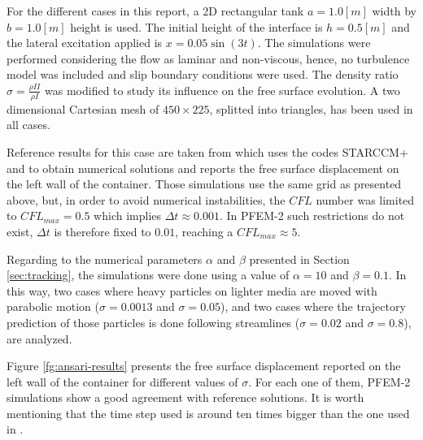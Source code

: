 For the different cases in this report, a 2D rectangular tank $a=1.0[m]$ width by $b=1.0[m]$ height is used. The initial height of the interface is $h=0.5[m]$ and the lateral excitation applied is $x=0.05\sin(3t)$. The simulations were performed considering the flow as laminar and non-viscous, hence, no turbulence model was included and slip boundary conditions were used. The density ratio $\sigma=\frac{\rho{II}}{\rho{I}}$ was modified to study its influence on the free surface evolution. A two dimensional Cartesian mesh of $450\times225$, splitted into triangles, has been used in all cases.

Reference results for this case are taken from \cite{Goni13} which uses the codes STARCCM+ and \OF to obtain numerical solutions and reports the free surface displacement on the left wall of the container. Those simulations use the same grid as presented above, but, in order to avoid numerical instabilities, the $CFL$ number was limited to $CFL_{max}=0.5$ which implies $\Delta t \approx 0.001$. In PFEM-2 such restrictions do not exist, $\Delta t$ is therefore fixed to $0.01$, reaching a $CFL_{max}\approx5$.

Regarding to the numerical parameters $\alpha$ and $\beta$ presented in Section \ref{sec:tracking}, the simulations were done using a value of $\alpha=10$ and $\beta=0.1$. In this way, two cases where heavy particles on lighter media are moved with parabolic motion ($\sigma=0.0013$ and $\sigma=0.05$), and two cases where the trajectory prediction of those particles is done following streamlines ($\sigma=0.02$ and $\sigma=0.8$), are analyzed.

Figure \ref{fg:ansari-results} presents the free surface displacement reported on the left wall of the container for different values of $\sigma$. For each one of them, PFEM-2 simulations show a good agreement with reference solutions. It is worth mentioning that the time step used is around ten times bigger than the one used in \cite{Goni13}. 

